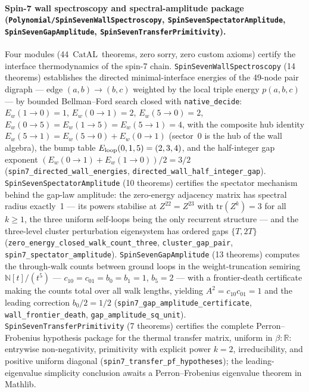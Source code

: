 \documentclass[11pt,a4paper]{article}
\theoremstyle{definition}
\newcommand{\CatAL}{\ensuremath{\mathrm{CatAL}}}
\begin{document}
\paragraph{Spin-7 wall spectroscopy and spectral-amplitude package
  (\texttt{Polynomial/\allowbreak SpinSevenWallSpectroscopy},
   \texttt{SpinSevenSpectatorAmplitude},
   \texttt{SpinSevenGapAmplitude},
   \texttt{SpinSevenTransferPrimitivity}).}
Four modules (44~\CatAL\ theorems, zero sorry, zero custom axioms) certify
the interface thermodynamics of the spin-7 chain.
\texttt{SpinSevenWallSpectroscopy} (14 theorems) establishes the directed
minimal-interface energies of the 49-node pair digraph --- edge
$(a,b)\to(b,c)$ weighted by the local triple energy $p(a,b,c)$ --- by
bounded Bellman--Ford search closed with \texttt{native\_decide}:
$E_w(1{\to}0)=1$, $E_w(0{\to}1)=2$, $E_w(5{\to}0)=2$,
$E_w(0{\to}5)=E_w(1{\to}5)=E_w(5{\to}1)=4$, with the composite hub identity
$E_w(5{\to}1)=E_w(5{\to}0)+E_w(0{\to}1)$ (sector~0 is the hub of the wall
algebra), the bump table $E_{\rm loop}(0,1,5)=(2,3,4)$, and the half-integer
gap exponent $(E_w(0{\to}1)+E_w(1{\to}0))/2 = 3/2$
(\texttt{spin7\_directed\_wall\_energies},
 \texttt{directed\_wall\_half\_integer\_gap}).
\texttt{SpinSevenSpectatorAmplitude} (10 theorems) certifies the spectator
mechanism behind the gap-law amplitude: the zero-energy adjacency matrix has
spectral radius exactly~1 --- its powers stabilise at $Z^{22}=Z^{23}$ with
$\mathrm{tr}(Z^k)=3$ for all $k\ge1$, the three uniform self-loops being the
only recurrent structure --- and the three-level cluster perturbation
eigensystem has ordered gaps $\{T, 2T\}$
(\texttt{zero\_energy\_closed\_walk\_count\_three},
 \texttt{cluster\_gap\_pair}, \texttt{spin7\_spectator\_amplitude}).
\texttt{SpinSevenGapAmplitude} (13 theorems) computes the through-walk counts
between ground loops in the weight-truncation semiring
$\mathbb{N}[t]/(t^5)$ --- $c_{10}=c_{01}=b_0=b_1=1$, $b_5=2$ --- with a
frontier-death certificate making the counts total over all walk lengths,
yielding $A^2 = c_{10}c_{01} = 1$ and the leading correction $b_0/2 = 1/2$
(\texttt{spin7\_gap\_amplitude\_certificate}, \texttt{wall\_frontier\_death},
 \texttt{gap\_amplitude\_sq\_unit}).
\texttt{SpinSevenTransferPrimitivity} (7 theorems) certifies the complete
Perron--Frobenius hypothesis package for the thermal transfer matrix,
uniform in $\beta:\mathbb{R}$: entrywise non-negativity, primitivity with
explicit power $k=2$, irreducibility, and positive uniform diagonal
(\texttt{spin7\_transfer\_pf\_hypotheses}); the leading-eigenvalue
simplicity conclusion awaits a Perron--Frobenius eigenvalue theorem in
Mathlib.
\end{document}
